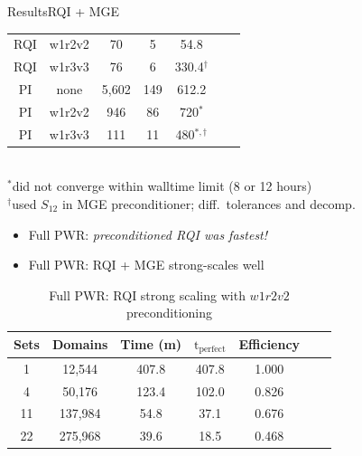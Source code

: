 \documentclass[final]{beamer}
\begin{document}
\begin{frame}{}
\begin{columns}[t]
\begin{column}{.3\linewidth}
\begin{block}{Results\textemdash RQI + MGE}
\begin{table}[h!]
\begin{tabular}{ c  c  c  c  c  c  c }
      RQI & \textcolor{dgreen}{w1r2v2} & 70    & 5   & \textcolor{dgreen}{54.8} \\
      RQI & w1r3v3 & 76    & 6   & 330.4$^{\dag}$ \\
      PI  & \textcolor{rawsienna}{none}   & 5,602 & 149 & \textcolor{rawsienna}{612.2} \\
      PI  & w1r2v2 & 946   & 86  & 720$^*$ \\
      PI  & w1r3v3 & 111   & 11  & 480$^{*,\dag}$ \\
      \hline
    \end{tabular}\\
    \footnotesize{$^{*}$did not converge within walltime limit (8 or 12 hours)\\
    $^{\dag}$used $S_{12}$ in MGE preconditioner; diff.\ tolerances and decomp.}\\
  \label{tab:PWR all}
\end{table}
%
	 \begin{itemize}
	 \item{Full PWR: \textit{preconditioned RQI was fastest!}}
	 \item{Full PWR: RQI + MGE strong-scales well}
	 \end{itemize}
\vspace*{-0.3 em}
\begin{table}[h!]
  \caption{Full PWR: RQI strong scaling with $w1r2v2$ preconditioning}
  \begin{tabular}{ c  c  c  c  c  c  c }
     \hline
      Sets & Domains & Time (m) & $\text{t}_{\text{perfect}}$ & Efficiency \\
      \hline
      1   & 12,544 & 407.8 & 407.8 & 1.000 \\
      4   & 50,176 & 123.4 & 102.0 & 0.826\\
      11  & 137,984 & 54.8 & 37.1  & 0.676\\
      22  & 275,968 & 39.6 & 18.5  & 0.468\\
      \hline
  \end{tabular}
  \label{tab:PWR rqi strong scaling}
\end{table}

\end{block}
\end{column}
\end{columns}
\end{frame}
\end{document}
